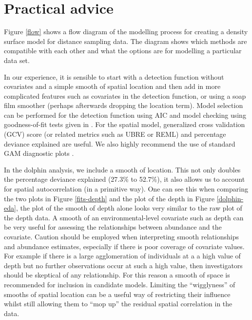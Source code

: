 \documentclass[a4paper,12pt]{article}
\begin{document}
\section*{Practical advice}
\label{s:practical}

Figure \ref{flow} shows a flow diagram of the modelling process for creating a density surface model for distance sampling data. The diagram shows which methods are compatible with each other and what the options are for modelling a particular data set.

In our experience, it is sensible to start with a detection function without covariates and a simple smooth of spatial location and then add in more complicated features such as covariates in the detection function, or using a soap film smoother (perhaps afterwards dropping the location term). Model selection can be performed for the detection function using AIC and model checking using goodness-of-fit tests given in \cite{Buckland:2004ts}. For the spatial model, generalized cross validation (GCV) score (or related metrics such as UBRE or REML) and percentage deviance explained are useful. We also highly recommend the use of standard GAM diagnostic plots \citep[Chapter 5]{Wood:2006wz}. 

In the dolphin analysis, we include a smooth of location. This not only doubles the percentage deviance explained (27.3\% to 52.7\%), it also allows us to account for spatial autocorrelation (in a primitive way). One can see this when comparing the two plots in Figure \ref{fits-depth} and the plot of the depth in Figure \ref{dolphin-eda}, the plot of the smooth of depth alone looks very similar to the raw plot of the depth data. A smooth of an environmental-level covariate such as depth can be very useful for assessing the relationships between abundance and the covariate. Caution should be employed when interpreting smooth relationships and abundance estimates, especially if there is poor coverage of covariate values. For example if there is a large agglomeration of individuals at a a high value of depth but no further observations occur at such a high value, then investigators should be skeptical of any relationship. For this reason a smooth of space is recommended for inclusion in candidate models. Limiting the ``wigglyness'' of smooths of spatial location can be a useful way of restricting their influence whilst still allowing them to ``mop up'' the residual spatial correlation in the data.


%
\end{document}
